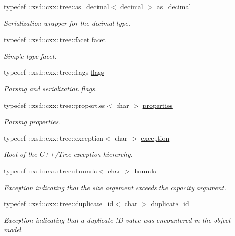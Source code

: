 \begin{DoxyCompactItemize}
typedef \+::xsd\+::cxx\+::tree\+::as\+\_\+decimal$<$ \hyperlink{namespacexml__schema_a69bfaf24f63a8c18ebd8e21db6b343df}{decimal} $>$ \hyperlink{namespacexml__schema_a60dfdca63dedf12d8a524c0496def693}{as\+\_\+decimal}
\begin{DoxyCompactList}\small\item\em Serialization wrapper for the decimal type. \end{DoxyCompactList}\item 
typedef \+::xsd\+::cxx\+::tree\+::facet \hyperlink{namespacexml__schema_ae447ddf0dd2470b5a095774e0b359a86}{facet}
\begin{DoxyCompactList}\small\item\em Simple type facet. \end{DoxyCompactList}\item 
typedef \+::xsd\+::cxx\+::tree\+::flags \hyperlink{namespacexml__schema_a8d981c127a1f5106d04ad5853e707361}{flags}
\begin{DoxyCompactList}\small\item\em Parsing and serialization flags. \end{DoxyCompactList}\item 
typedef \+::xsd\+::cxx\+::tree\+::properties$<$ char $>$ \hyperlink{namespacexml__schema_aba199bc39c8b21c427369c27d2bcfc8c}{properties}
\begin{DoxyCompactList}\small\item\em Parsing properties. \end{DoxyCompactList}\item 
typedef \+::xsd\+::cxx\+::tree\+::exception$<$ char $>$ \hyperlink{namespacexml__schema_a7eb0fa6af3de36ea17011d26a731b62b}{exception}
\begin{DoxyCompactList}\small\item\em Root of the C++/\+Tree exception hierarchy. \end{DoxyCompactList}\item 
typedef \+::xsd\+::cxx\+::tree\+::bounds$<$ char $>$ \hyperlink{namespacexml__schema_a00337f2f08dbcb24280f5cf7b96224ea}{bounds}
\begin{DoxyCompactList}\small\item\em Exception indicating that the size argument exceeds the capacity argument. \end{DoxyCompactList}\item 
typedef \+::xsd\+::cxx\+::tree\+::duplicate\+\_\+id$<$ char $>$ \hyperlink{namespacexml__schema_a22a2b3c973b87b06c2868d85a154fd63}{duplicate\+\_\+id}
\begin{DoxyCompactList}\small\item\em Exception indicating that a duplicate I\+D value was encountered in the object model. \end{DoxyCompactList}\item 

\end{DoxyCompactItemize}

